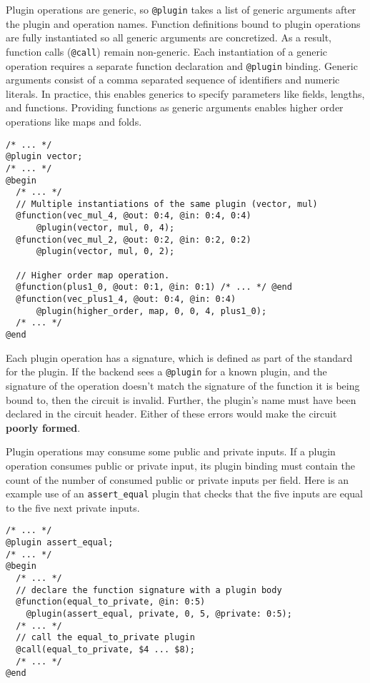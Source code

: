 Plugin operations are generic, so \texttt{@plugin} takes a list of generic arguments after the plugin and operation names.
Function definitions bound to plugin operations are fully instantiated so all generic arguments are concretized. 
As a result, function calls (\texttt{@call}) remain non-generic.
Each instantiation of a generic operation %
requires a separate function declaration and \texttt{@plugin} binding.
Generic arguments consist of a comma separated sequence
of identifiers and numeric literals.
In practice, this enables generics to specify parameters like fields, lengths, and functions.
Providing functions as generic arguments enables higher order operations like maps and folds. 
%
\begin{lstlisting}[language=ir]
/* ... */
@plugin vector;
/* ... */
@begin
  /* ... */
  // Multiple instantiations of the same plugin (vector, mul)
  @function(vec_mul_4, @out: 0:4, @in: 0:4, 0:4)
      @plugin(vector, mul, 0, 4);
  @function(vec_mul_2, @out: 0:2, @in: 0:2, 0:2)
      @plugin(vector, mul, 0, 2);

  // Higher order map operation.
  @function(plus1_0, @out: 0:1, @in: 0:1) /* ... */ @end
  @function(vec_plus1_4, @out: 0:4, @in: 0:4)
      @plugin(higher_order, map, 0, 0, 4, plus1_0);
  /* ... */
@end
\end{lstlisting}

Each plugin operation has a signature, which is defined as part of the standard for the plugin.
If the backend sees a \texttt{@plugin} for a known plugin, and the signature of the operation doesn't match the signature of the function it is being bound to, then the circuit is invalid.
Further, the plugin's name must have been declared in the circuit header.
Either of these errors would make the circuit \textbf{poorly formed}.

Plugin operations may consume some public and private inputs.
If a plugin operation consumes public or private input, its plugin binding
must contain the count of the number of consumed public or private inputs
per field.
%
Here is an example use of an \texttt{assert\_equal} plugin that checks that the five inputs are equal to the five next private inputs.
\begin{lstlisting}[language=ir]
/* ... */
@plugin assert_equal;
/* ... */
@begin
  /* ... */
  // declare the function signature with a plugin body
  @function(equal_to_private, @in: 0:5)
    @plugin(assert_equal, private, 0, 5, @private: 0:5);
  /* ... */
  // call the equal_to_private plugin
  @call(equal_to_private, $4 ... $8);
  /* ... */
@end
\end{lstlisting}

